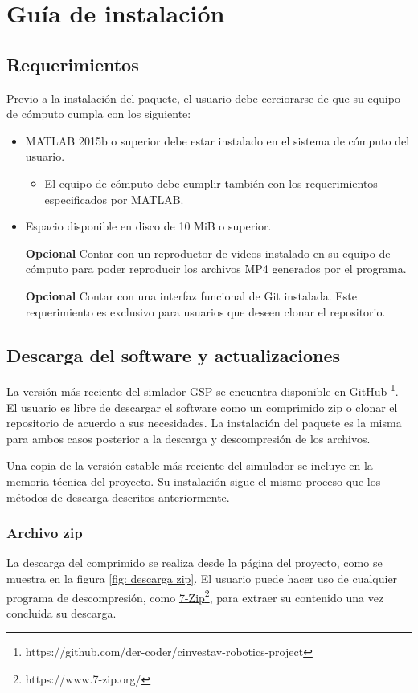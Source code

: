 \chapter{Guía de instalación}

\section{Requerimientos}
Previo a la instalación del paquete, el usuario debe cerciorarse de que su 
equipo de cómputo cumpla con los siguiente:

\begin{itemize}
 \item MATLAB 2015b o superior debe estar instalado en el sistema de cómputo del 
usuario.

\begin{itemize}
 \item El equipo de cómputo debe cumplir también con los requerimientos especificados
por MATLAB.
\end{itemize}
 \item Espacio disponible en disco de 10 MiB o superior.
 \item [\textbf{Opcional}] Contar con un reproductor de videos 
instalado en su equipo de cómputo para poder reproducir los archivos MP4 
generados por el programa.
\item [\textbf{Opcional}] Contar con una interfaz funcional de Git instalada. 
Este requerimiento es exclusivo para usuarios que deseen clonar el repositorio.
\end{itemize}


\section{Descarga del software y actualizaciones}
La versión más reciente del simlador GSP se encuentra disponible en 
\href{https://github.com/der-coder/cinvestav-robotics-project/tree/master}{GitHub} 
\footnote{https://github.com/der-coder/cinvestav-robotics-project}. El usuario es
libre de descargar el software como un comprimido zip o clonar el repositorio de 
acuerdo a sus necesidades. La instalación del paquete es la misma para ambos casos
posterior a la descarga y descompresión de los archivos.

Una copia de la versión estable más reciente del simulador se incluye en la memoria
técnica del proyecto. Su instalación sigue el mismo proceso que los métodos de descarga
descritos anteriormente.

\subsection{Archivo zip}
La descarga del comprimido se realiza desde la página del proyecto, como se muestra 
en la figura \ref{fig: descarga zip}. El usuario puede hacer uso de cualquier programa 
de descompresión, como \href{https://www.7-zip.org/}{7-Zip}\footnote{https://www.7-zip.org/}, 
para extraer su contenido una vez concluida su descarga.

